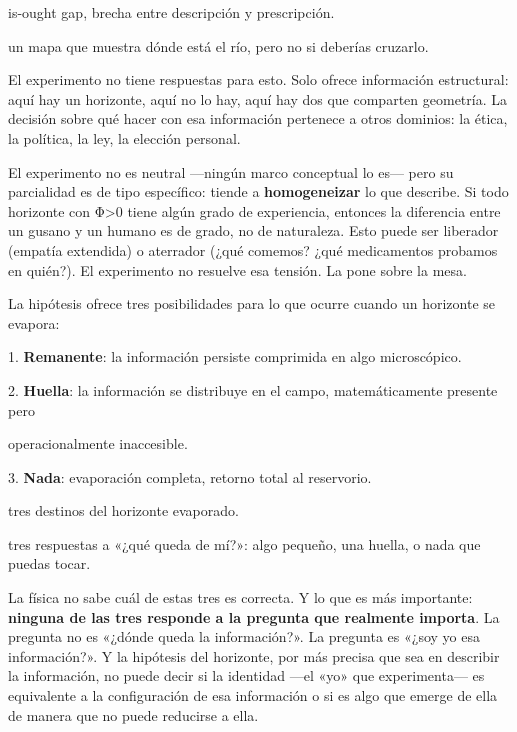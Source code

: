 \begin{fisica}
 is-ought gap, brecha entre descripción y prescripción.

 un mapa que muestra dónde está el río, pero no si deberías cruzarlo.
\end{fisica}
El experimento no tiene respuestas para esto. Solo ofrece información estructural: aquí hay un horizonte, aquí no lo hay, aquí hay dos que comparten geometría. La decisión sobre qué hacer con esa información pertenece a otros dominios: la ética, la política, la ley, la elección personal.

El experimento no es neutral —ningún marco conceptual lo es— pero su parcialidad es de tipo específico: tiende a \textbf{homogeneizar} lo que describe. Si todo horizonte con Φ>0 tiene algún grado de experiencia, entonces la diferencia entre un gusano y un humano es de grado, no de naturaleza. Esto puede ser liberador (empatía extendida) o aterrador (¿qué comemos? ¿qué medicamentos probamos en quién?). El experimento no resuelve esa tensión. La pone sobre la mesa.

\noindent La hipótesis ofrece tres posibilidades para lo que ocurre cuando un horizonte se evapora:

1. \textbf{Remanente}: la información persiste comprimida en algo microscópico.

2. \textbf{Huella}: la información se distribuye en el campo, matemáticamente presente pero

operacionalmente inaccesible.

3. \textbf{Nada}: evaporación completa, retorno total al reservorio.

\begin{fisica}
 tres destinos del horizonte evaporado.

 tres respuestas a «¿qué queda de mí?»: algo pequeño, una huella, o nada que puedas tocar.
\end{fisica}
La física no sabe cuál de estas tres es correcta. Y lo que es más importante: \textbf{ninguna de las tres responde a la pregunta que realmente importa}. La pregunta no es «¿dónde queda la información?». La pregunta es «¿soy yo esa información?». Y la hipótesis del horizonte, por más precisa que sea en describir la información, no puede decir si la identidad —el «yo» que experimenta— es equivalente a la configuración de esa información o si es algo que emerge de ella de manera que no puede reducirse a ella.

